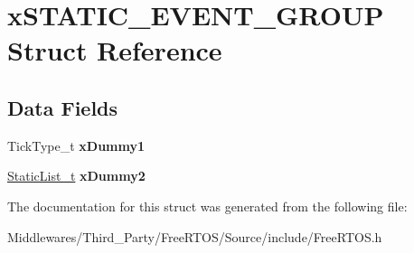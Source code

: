 \hypertarget{structx_s_t_a_t_i_c___e_v_e_n_t___g_r_o_u_p}{}\section{x\+S\+T\+A\+T\+I\+C\+\_\+\+E\+V\+E\+N\+T\+\_\+\+G\+R\+O\+UP Struct Reference}
\label{structx_s_t_a_t_i_c___e_v_e_n_t___g_r_o_u_p}
\subsection*{Data Fields}
\begin{DoxyCompactItemize}
\item 
\mbox{\label{structx_s_t_a_t_i_c___e_v_e_n_t___g_r_o_u_p_a7eacc6e12219b6aee0a8838ae4d5fa67}} 
Tick\+Type\+\_\+t {\bfseries x\+Dummy1}
\item 
\mbox{\label{structx_s_t_a_t_i_c___e_v_e_n_t___g_r_o_u_p_ad8843df8638b72338cada5065facc7ea}} 
\mbox{\hyperlink{structx_s_t_a_t_i_c___l_i_s_t}{Static\+List\+\_\+t}} {\bfseries x\+Dummy2}
\end{DoxyCompactItemize}


The documentation for this struct was generated from the following file\+:\begin{DoxyCompactItemize}
\item 
Middlewares/\+Third\+\_\+\+Party/\+Free\+R\+T\+O\+S/\+Source/include/Free\+R\+T\+O\+S.\+h\end{DoxyCompactItemize}
